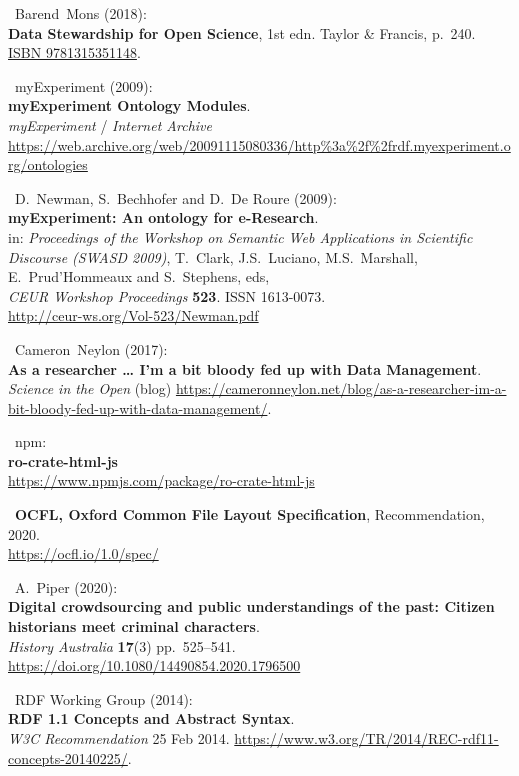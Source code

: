 \begin{thebibliography}{9}
~Barend~Mons (2018):\\
\textbf{Data Stewardship for Open Science}, 1st edn. Taylor \& Francis,
p.~240. \href{https://identifiers.org/isbn/9781315351148}{ISBN
9781315351148}.

~myExperiment (2009):\\
\textbf{myExperiment Ontology Modules}.\\
\emph{myExperiment} / \emph{Internet Archive}\\
\url{https://web.archive.org/web/20091115080336/http\%3a\%2f\%2frdf.myexperiment.org/ontologies}

~D.~Newman, S.~Bechhofer and D.~De Roure (2009):\\
\textbf{myExperiment: An ontology for e-Research}.\\
in: \emph{Proceedings of the Workshop on Semantic Web Applications in
Scientific Discourse (SWASD 2009)}, T.~Clark, J.S.~Luciano,
M.S.~Marshall, E.~Prud'Hommeaux and S.~Stephens, eds,\\
\emph{CEUR Workshop Proceedings} \textbf{523}. ISSN 1613-0073.\\
\url{http://ceur-ws.org/Vol-523/Newman.pdf}

~Cameron~Neylon (2017):\\
\textbf{As a researcher \ldots{} I'm a bit bloody fed up with Data
Management}.\\
\emph{Science in the Open} (blog)
\url{https://cameronneylon.net/blog/as-a-researcher-im-a-bit-bloody-fed-up-with-data-management/}.

~npm:\\
\textbf{ro-crate-html-js}\\
\url{https://www.npmjs.com/package/ro-crate-html-js}

~\textbf{OCFL, Oxford Common File Layout Specification},
Recommendation, 2020.\\
\url{https://ocfl.io/1.0/spec/}

~A.~Piper (2020):\\
\textbf{Digital crowdsourcing and public understandings of the past:
Citizen historians meet criminal characters}.\\
\emph{History Australia} \textbf{17}(3) pp.~525--541.\\
\url{https://doi.org/10.1080/14490854.2020.1796500}

~RDF Working Group (2014):\\
\textbf{RDF 1.1 Concepts and Abstract Syntax}.\\
\emph{W3C Recommendation} 25 Feb 2014.
\url{https://www.w3.org/TR/2014/REC-rdf11-concepts-20140225/}.


\end{thebibliography}

